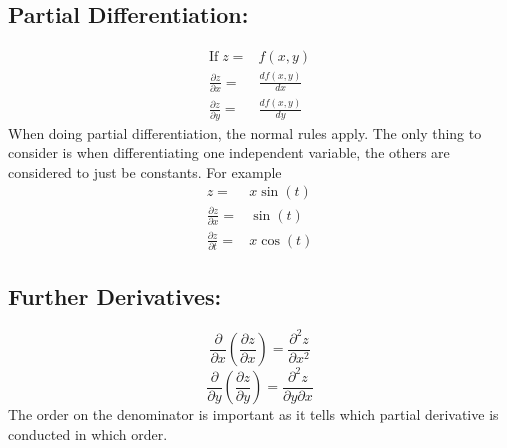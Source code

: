 \documentclass[a5paper]{article}
\begin{document}
	\subsection{Partial Differentiation:}
	\begin{align*}
		\text{If}\;z=&f(x,y)\\
		\frac{\partial z}{\partial x}=&\frac{df(x,y)}{dx}\\
		\frac{\partial z}{\partial y}=&\frac{df(x,y)}{dy}
	\end{align*}
	When doing partial differentiation, the normal rules apply. The only thing to consider is when differentiating one independent variable, the others are considered to just be constants. For example
	\begin{align*}
		z=&x\sin{(t)}\\
		\frac{\partial z}{\partial x}=&\sin{(t)}\\
		\frac{\partial z}{\partial t}=&x\cos{(t)}
	\end{align*}
	\subsection{Further Derivatives:}
	$$\frac{\partial}{\partial x}(\frac{\partial z}{\partial x})=\frac{\partial^{2}z}{\partial x^{2}}$$
	$$\frac{\partial}{\partial y}(\frac{\partial z}{\partial y})=\frac{\partial^{2}z}{\partial y\partial x}$$
	The order on the denominator is important as it tells which partial derivative is conducted in which order.
\end{document}
